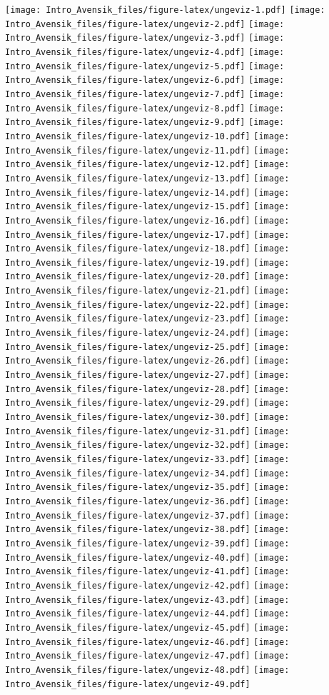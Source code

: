 \documentclass[
]{book}
\begin{document}
\texttt{[image: Intro\_Avensik\_files/figure-latex/ungeviz-1.pdf]} \texttt{[image: Intro\_Avensik\_files/figure-latex/ungeviz-2.pdf]} \texttt{[image: Intro\_Avensik\_files/figure-latex/ungeviz-3.pdf]} \texttt{[image: Intro\_Avensik\_files/figure-latex/ungeviz-4.pdf]} \texttt{[image: Intro\_Avensik\_files/figure-latex/ungeviz-5.pdf]} \texttt{[image: Intro\_Avensik\_files/figure-latex/ungeviz-6.pdf]} \texttt{[image: Intro\_Avensik\_files/figure-latex/ungeviz-7.pdf]} \texttt{[image: Intro\_Avensik\_files/figure-latex/ungeviz-8.pdf]} \texttt{[image: Intro\_Avensik\_files/figure-latex/ungeviz-9.pdf]} \texttt{[image: Intro\_Avensik\_files/figure-latex/ungeviz-10.pdf]} \texttt{[image: Intro\_Avensik\_files/figure-latex/ungeviz-11.pdf]} \texttt{[image: Intro\_Avensik\_files/figure-latex/ungeviz-12.pdf]} \texttt{[image: Intro\_Avensik\_files/figure-latex/ungeviz-13.pdf]} \texttt{[image: Intro\_Avensik\_files/figure-latex/ungeviz-14.pdf]} \texttt{[image: Intro\_Avensik\_files/figure-latex/ungeviz-15.pdf]} \texttt{[image: Intro\_Avensik\_files/figure-latex/ungeviz-16.pdf]} \texttt{[image: Intro\_Avensik\_files/figure-latex/ungeviz-17.pdf]} \texttt{[image: Intro\_Avensik\_files/figure-latex/ungeviz-18.pdf]} \texttt{[image: Intro\_Avensik\_files/figure-latex/ungeviz-19.pdf]} \texttt{[image: Intro\_Avensik\_files/figure-latex/ungeviz-20.pdf]} \texttt{[image: Intro\_Avensik\_files/figure-latex/ungeviz-21.pdf]} \texttt{[image: Intro\_Avensik\_files/figure-latex/ungeviz-22.pdf]} \texttt{[image: Intro\_Avensik\_files/figure-latex/ungeviz-23.pdf]} \texttt{[image: Intro\_Avensik\_files/figure-latex/ungeviz-24.pdf]} \texttt{[image: Intro\_Avensik\_files/figure-latex/ungeviz-25.pdf]} \texttt{[image: Intro\_Avensik\_files/figure-latex/ungeviz-26.pdf]} \texttt{[image: Intro\_Avensik\_files/figure-latex/ungeviz-27.pdf]} \texttt{[image: Intro\_Avensik\_files/figure-latex/ungeviz-28.pdf]} \texttt{[image: Intro\_Avensik\_files/figure-latex/ungeviz-29.pdf]} \texttt{[image: Intro\_Avensik\_files/figure-latex/ungeviz-30.pdf]} \texttt{[image: Intro\_Avensik\_files/figure-latex/ungeviz-31.pdf]} \texttt{[image: Intro\_Avensik\_files/figure-latex/ungeviz-32.pdf]} \texttt{[image: Intro\_Avensik\_files/figure-latex/ungeviz-33.pdf]} \texttt{[image: Intro\_Avensik\_files/figure-latex/ungeviz-34.pdf]} \texttt{[image: Intro\_Avensik\_files/figure-latex/ungeviz-35.pdf]} \texttt{[image: Intro\_Avensik\_files/figure-latex/ungeviz-36.pdf]} \texttt{[image: Intro\_Avensik\_files/figure-latex/ungeviz-37.pdf]} \texttt{[image: Intro\_Avensik\_files/figure-latex/ungeviz-38.pdf]} \texttt{[image: Intro\_Avensik\_files/figure-latex/ungeviz-39.pdf]} \texttt{[image: Intro\_Avensik\_files/figure-latex/ungeviz-40.pdf]} \texttt{[image: Intro\_Avensik\_files/figure-latex/ungeviz-41.pdf]} \texttt{[image: Intro\_Avensik\_files/figure-latex/ungeviz-42.pdf]} \texttt{[image: Intro\_Avensik\_files/figure-latex/ungeviz-43.pdf]} \texttt{[image: Intro\_Avensik\_files/figure-latex/ungeviz-44.pdf]} \texttt{[image: Intro\_Avensik\_files/figure-latex/ungeviz-45.pdf]} \texttt{[image: Intro\_Avensik\_files/figure-latex/ungeviz-46.pdf]} \texttt{[image: Intro\_Avensik\_files/figure-latex/ungeviz-47.pdf]} \texttt{[image: Intro\_Avensik\_files/figure-latex/ungeviz-48.pdf]} \texttt{[image: Intro\_Avensik\_files/figure-latex/ungeviz-49.pdf]} 
\end{document}

